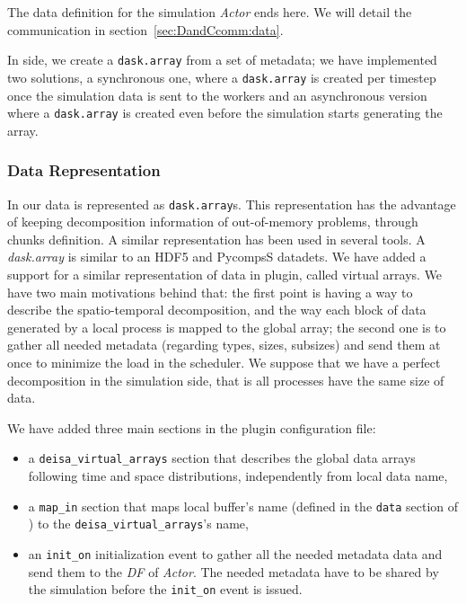 The data definition for the simulation \textit{Actor} ends here. We will detail the communication in section~\ref{sec:DandCcomm:data}.

In \dask side, we create a \texttt{dask.array} from a set of metadata; we have implemented two solutions, a synchronous one, where a \texttt{dask.array} is created per timestep once the simulation data is sent to the workers and an asynchronous version where a \texttt{dask.array} is created even before the simulation starts generating the array. 


\subsubsection{Data Representation}\label{sec:datamodel:datarepresent}

In \dask our data is represented as \texttt{dask.array}s. This representation has the advantage of keeping decomposition information of out-of-memory problems, through chunks definition. A similar representation has been used in several tools. A \textit{dask.array} is similar to an HDF5 and PycompsS datadets. 
We have added a support for a similar representation of data in \deisa plugin, called \deisa virtual arrays. We have two main motivations behind that: the first point is having a way to describe the spatio-temporal decomposition, and the way each block of data generated by a local process is mapped to the global array; the second one is to gather all needed metadata (regarding types, sizes, subsizes) and send them at once to minimize the load in the scheduler.   
We suppose that we have a perfect decomposition in the simulation side, that is all processes have the same size of data. 

We have added three main sections in the \deisa plugin configuration file:
\begin{itemize}
    \item a \texttt{deisa\_virtual\_arrays} section that describes the global data arrays following time and space distributions, independently from local data name,
    \item a \texttt{map\_in} section that maps local buffer's name (defined in the \texttt{data} section of \pdi) to the \texttt{deisa\_virtual\_arrays}'s name,
    \item an \texttt{init\_on} initialization event to gather all the needed metadata data and send them to the \textit{DF} of \dask \textit{Actor}. The needed metadata have to be shared by the simulation before the \texttt{init\_on} event is issued. 
\end{itemize}


